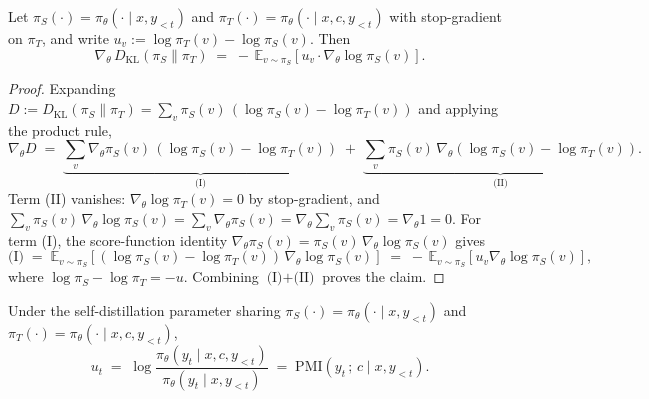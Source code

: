 \documentclass{llmxive}
\begin{document}
\begin{lemma}
  \label{lem:rkl-grad}
  Let $\pi_S(\cdot) = \pi_\theta(\cdot \mid x, y_{<t})$ and $\pi_T(\cdot) = \pi_\theta(\cdot \mid x, c, y_{<t})$ with stop-gradient on $\pi_T$, and write $u_v := \log \pi_T(v) - \log \pi_S(v)$. Then
  \begin{equation*}
    \nabla_\theta\, D_{\mathrm{KL}}(\pi_S \| \pi_T)
    \;=\; -\,\mathbb{E}_{v \sim \pi_S}\!\left[ u_v \cdot \nabla_\theta \log \pi_S(v) \right].
  \end{equation*}
\end{lemma}

\begin{proof}
  Expanding $D := D_{\mathrm{KL}}(\pi_S \| \pi_T) = \sum_v \pi_S(v)\,(\log \pi_S(v) - \log \pi_T(v))$ and applying the product rule,
  \begin{equation*}
    \nabla_\theta D
    \;=\;
    \underbrace{\sum_v \nabla_\theta \pi_S(v)\,(\log \pi_S(v) - \log \pi_T(v))}_{\text{(I)}}
    \;+\;
    \underbrace{\sum_v \pi_S(v)\,\nabla_\theta (\log \pi_S(v) - \log \pi_T(v))}_{\text{(II)}}.
  \end{equation*}
  Term (II) vanishes: $\nabla_\theta \log \pi_T(v) = 0$ by stop-gradient, and $\sum_v \pi_S(v)\,\nabla_\theta \log \pi_S(v) = \sum_v \nabla_\theta \pi_S(v) = \nabla_\theta \sum_v \pi_S(v) = \nabla_\theta 1 = 0$. For term (I), the score-function identity $\nabla_\theta \pi_S(v) = \pi_S(v)\,\nabla_\theta \log \pi_S(v)$ gives
  \begin{equation*}
    \text{(I)} \;=\; \mathbb{E}_{v \sim \pi_S}\!\left[(\log \pi_S(v) - \log \pi_T(v))\,\nabla_\theta \log \pi_S(v)\right] \;=\; -\,\mathbb{E}_{v \sim \pi_S}\!\left[u_v \nabla_\theta \log \pi_S(v)\right],
  \end{equation*}
  where $\log \pi_S - \log \pi_T = -u$. Combining $\text{(I)} + \text{(II)}$ proves the claim.
\end{proof}

\begin{lemma}
  \label{lem:pmi}
  Under the self-distillation parameter sharing $\pi_S(\cdot) = \pi_\theta(\cdot \mid x, y_{<t})$ and $\pi_T(\cdot) = \pi_\theta(\cdot \mid x, c, y_{<t})$,
  \begin{equation*}
    u_t \;=\; \log \frac{\pi_\theta(y_t \mid x, c, y_{<t})}{\pi_\theta(y_t \mid x, y_{<t})} \;=\; \mathrm{PMI}(y_t\,;\, c \mid x, y_{<t}).
  \end{equation*}
\end{lemma}
\end{document}

